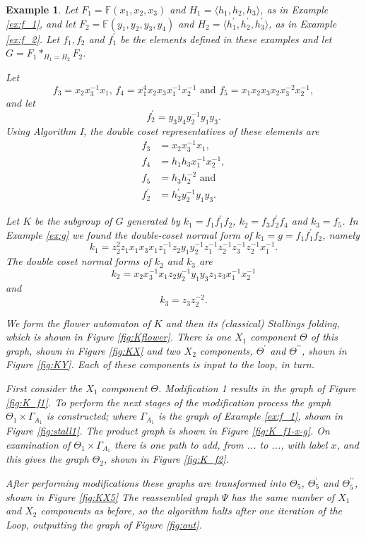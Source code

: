 \documentclass[a4paper,12pt]{article}
\newcommand{\G}{\Gamma }
\newtheorem{exam}[theorem]{Example}
\newenvironment{example}{\begin{exam} \rm}{\end{exam}}
\numberwithin{equation}{section}
\numberwithin{figure}{section}
\newcommand{\FF}{\ensuremath{\mathbb{F}}}
\newcommand{\la}{\langle}
\newcommand{\ra}{\rangle}
\begin{document}
\begin{example}\label{ex:K}
Let $F_1=\FF(x_1,x_2,x_3)$ and $H_1=\la h_1,h_2,h_3\ra$, 
as in Example \ref{ex:f_1}, and let $F_2=\FF(y_1,y_2,y_3,y_4)$ and 
$H_2=\la h_1^\prime, h_2^\prime, h_3^\prime\ra$, as in Example \ref{ex:f_2}.
Let $f_1,f_2$ and $f_1^\prime$ be the elements defined in these examples
 and let $G=F_1\ast_{H_1=H_2} F_2$.  

Let  
\[f_3=x_2x_3^{-1}x_1,\, f_4= x_1^4 x_2 x_3 x_1^{-1} x_2^{-1} 
\textrm{ and } f_5=x_1x_2x_3x_2x_3^{-2}x_2^{-1},\]  
and let 
\[ f_2^\prime =y_3y_4y_2^{-1}y_1y_3.\]
Using Algorithm I, the double coset representatives of these elements are
\begin{align*}
f_3 & = x_2x_3^{-1}x_1,\\
f_4 &= h_1h_3 x_1^{-1}x_2^{-1},\\
f_5 &= h_3h_2^{-2}\textrm{ and }\\
f_2^\prime &= h_2^\prime y_2^{-1}y_1y_3.
\end{align*} 

Let $K$ be the subgroup of $G$ generated by $k_1=f_1f_1^\prime f_2$, 
$k_2= f_3f_2^\prime f_4$ and $k_3=f_5$. 
In Example \ref{ex:g} we found the double-coset normal form of
$k_1=g=f_1f_1^\prime f_2$, namely
\[k_1=z_2^2 z_1  x_1 x_3 x_1 z_1^{-1} 
z_2y_1y_2^{-1} z_1^{-1}z_2^{-1}
z_3^{-1}z_2^{-1} x_1^{-1}.\]
The double coset normal forms of $k_2$ and $k_3$ are 
\[k_2=  x_2x_3^{-1}x_1  z_2 y_2^{-1}y_1y_3 z_1z_3 x_1^{-1}x_2^{-1}\]
and 
\[k_3 = z_3z_2^{-2}.\]

We form the flower automaton of $K$ and then its (classical) Stallings folding,
which is 
shown in Figure \ref{fig:Kflower}.
There is one $X_1$ component $\Theta$ of this graph, shown in Figure \ref{fig:KX} 
and two $X_2$ components, $\Theta^\prime$ and $\Theta^{\prime\prime}$, shown in Figure \ref{fig:KY}. Each of these components is input to the loop, in turn.

First consider the $X_1$ component $\Theta$. Modification 1 results in the
graph of Figure \ref{fig:K_f1}. To perform the next stages of the  modification 
process the graph $\Theta_1 \times \G_{A_1}$ is constructed; where $\G_{A_1}$ is the
graph of Example \ref{ex:f_1}, shown in Figure \ref{fig:stall1}. The product graph
is 
shown in Figure \ref{fig:K_f1-x-g}. On examination of $\Theta_1 \times \G_{A_1}$
there is one path to add, from ... to ..., with label $x$, and this gives the
graph $\Theta_2$, shown in Figure \ref{fig:K_f2}.


After performing modifications these  graphs are transformed into
 $\Theta_5$, $\Theta_5^{\prime}$ and $\Theta_5^{\prime\prime}$, shown in Figure \ref{fig:KX5}
The reassembled graph $\Psi$ has the same number of $X_1$ and $X_2$ components as before, so 
the algorithm halts after one iteration of the Loop, outputting the graph of Figure 
\ref{fig:out}. 
\end{example}
\end{document}
